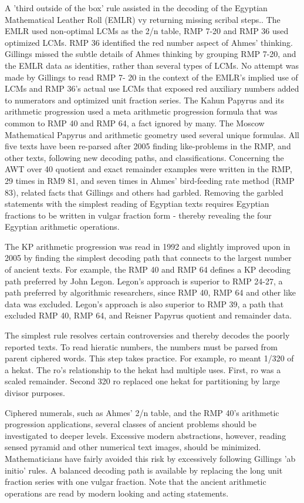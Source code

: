 \documentclass[12pt]{article}
\begin{document}
A 'third outside of the box' rule assisted in the decoding of the Egyptian Mathematical Leather Roll (EMLR) vy returning missing scribal steps.. The EMLR used non-optimal LCMs as the 2/n table, RMP 7-20 and RMP 36 used optimized LCMs. RMP 36 identified the red number aspect of Ahmes' thinking. Gillings missed the subtle details of Ahmes thinking by grouping RMP 7-20, and the EMLR data as identities, rather than several types of LCMs. No attempt was made by Gillings to read RMP 7- 20 in the context of the EMLR's implied use of LCMs and RMP 36's actual use LCMs that exposed red auxiliary numbers added to numerators and optimized unit fraction series. The Kahun Papyrus and its arithmetic progression used a meta arithmetic progression formula that was common to RMP 40 and RMP 64, a fact ignored by many. The Moscow Mathematical Papyrus and arithmetic geometry used several unique formulas. All five texts have been re-parsed after 2005 finding like-problems in the RMP, and other texts, following new decoding paths, and classifications. Concerning the AWT over 40 quotient and exact remainder examples were written in the RMP, 29 times in RM9 81, and seven times in Ahmes' bird-feeding rate method (RMP 83), related facts that Gillings and others had garbled. Removing the garbled statements with the simplest reading of Egyptian texts requires Egyptian fractions to be written in vulgar fraction form - thereby revealing the four Egyptian arithmetic operations. 

The KP arithmetic progression was read in 1992 and slightly improved upon in 2005 by finding the simplest decoding path that connects to the largest number of ancient texts. For example, the RMP 40 and RMP 64 defines a KP decoding path preferred by John Legon. Legon's approach is superior to RMP 24-27, a path preferred by algorithmic researchers, since RMP 40, RMP 64 and other like data was excluded. Legon's approach is also superior to RMP 39, a path that excluded RMP 40, RMP 64, and Reisner Papyrus quotient and remainder data.

The simplest rule resolves certain controversies and thereby decodes the poorly reported texts. To read hieratic numbers, the numbers must be parsed from parent ciphered words. This step takes practice. For example, ro meant 1/320 of a hekat. The ro's relationship to the hekat had multiple uses. First, ro was a scaled remainder. Second 320 ro replaced one hekat for partitioning by large divisor purposes.

Ciphered numerals, such as Ahmes' 2/n table, and the RMP 40's arithmetic progression applications, several classes of ancient problems should be investigated to deeper levels. Excessive modern abstractions, however, reading sensed pyramid and other numerical text images, should be minimized. Mathematicians have fairly avoided this risk by excessively following Gillings 'ab initio' rules. A balanced decoding path is available by replacing the long unit fraction series with one vulgar fraction. Note that the ancient arithmetic operations are read by modern looking and acting statements.
\end{document}
